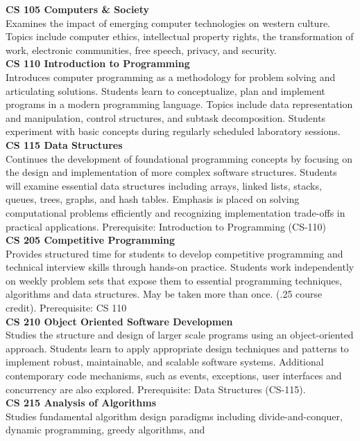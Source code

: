 \documentclass[
  letterpaper,
]{scrbook}
\begin{document}
\textbf{CS 105 Computers \& Society}\\
Examines the impact of emerging computer technologies on western
culture. Topics include computer ethics, intellectual property rights,
the transformation of work, electronic communities, free speech,
privacy, and security.\\
\textbf{CS 110 Introduction to Programming}\\
Introduces computer programming as a methodology for problem solving and
articulating solutions. Students learn to conceptualize, plan and
implement programs in a modern programming language. Topics include data
representation and manipulation, control structures, and subtask
decomposition. Students experiment with basic concepts during regularly
scheduled laboratory sessions.\\
\textbf{CS 115 Data Structures}\\
Continues the development of foundational programming concepts by
focusing on the design and implementation of more complex software
structures. Students will examine essential data structures including
arrays, linked lists, stacks, queues, trees, graphs, and hash tables.
Emphasis is placed on solving computational problems efficiently and
recognizing implementation trade-offs in practical applications.
Prerequisite: Introduction to Programming (CS-110)\\
\textbf{CS 205 Competitive Programming}\\
Provides structured time for students to develop competitive programming
and technical interview skills through hands-on practice. Students work
independently on weekly problem sets that expose them to essential
programming techniques, algorithms and data structures. May be taken
more than once. (.25 course credit). Prerequisite: CS 110\\
\textbf{CS 210 Object Oriented Software Developmen}\\
Studies the structure and design of larger scale programs using an
object-oriented approach. Students learn to apply appropriate design
techniques and patterns to implement robust, maintainable, and scalable
software systems. Additional contemporary code mechanisms, such as
events, exceptions, user interfaces and concurrency are also explored.
Prerequisite: Data Structures (CS-115).\\
\textbf{CS 215 Analysis of Algorithms}\\
Studies fundamental algorithm design paradigms including
divide-and-conquer, dynamic programming, greedy algorithms, and
\end{document}

